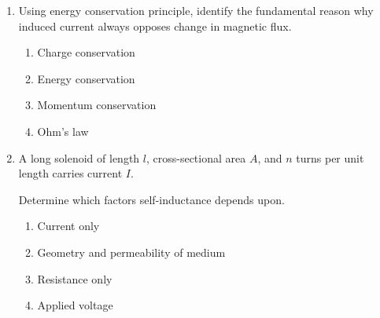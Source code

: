 \documentclass[12pt]{article}
\begin{document}
\begin{enumerate}
Determine magnitude of induced emf.

\begin{enumerate}[label=\Alph*)]
\item $N\dfrac{\Phi_2-\Phi_1}{\Delta t}$
\item $\dfrac{\Phi_2-\Phi_1}{\Delta t}$
\item $\dfrac{1}{N}\dfrac{\Phi_2-\Phi_1}{\Delta t}$
\item Zero
\end{enumerate}

\item Using energy conservation principle, identify the fundamental reason why induced current always opposes change in magnetic flux.

\begin{enumerate}[label=\Alph*)]
\item Charge conservation
\item Energy conservation
\item Momentum conservation
\item Ohm’s law
\end{enumerate}

\item A long solenoid of length $l$, cross-sectional area $A$, and $n$ turns per unit length carries current $I$.

Determine which factors self-inductance depends upon.

\begin{enumerate}[label=\Alph*)]
\item Current only
\item Geometry and permeability of medium
\item Resistance only
\item Applied voltage
\end{enumerate}

\end{enumerate}
\end{document}
